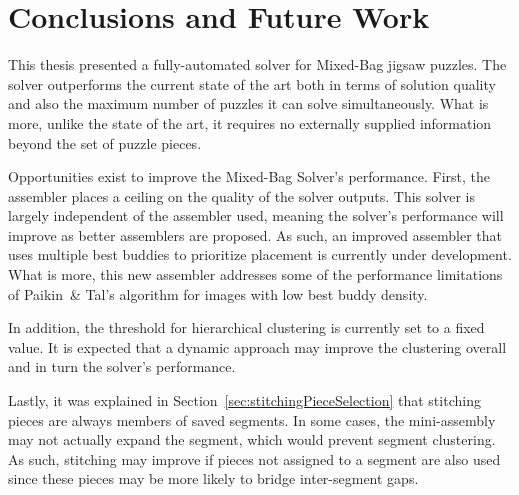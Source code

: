 \chapter{Conclusions and Future Work}

This thesis presented a fully-automated solver for Mixed-Bag jigsaw puzzles.  The solver outperforms the current state of the art both in terms of solution quality and also the maximum number of puzzles it can solve simultaneously.  What is more, unlike the state of the art, it requires no externally supplied information beyond the set of puzzle pieces.

Opportunities exist to improve the Mixed-Bag Solver's performance.  First, the assembler places a ceiling on the quality of the solver outputs.  This solver is largely independent of the assembler used, meaning the solver's performance will improve as better assemblers are proposed. As such, an improved assembler that uses multiple best buddies to prioritize placement is currently under development.  What is more, this new assembler addresses some of the performance limitations of Paikin~\& Tal's algorithm for images with low best buddy density.

In addition, the threshold for hierarchical clustering is currently set to a fixed value.  It is expected that a dynamic approach may improve the clustering overall and in turn the solver's performance.

Lastly, it was explained in Section~\ref{sec:stitchingPieceSelection} that stitching pieces are always members of saved segments.  In some cases, the mini-assembly may not actually expand the segment, which would prevent segment clustering.  As such, stitching may improve if pieces not assigned to a segment are also used since these pieces may be more likely to bridge inter-segment gaps.